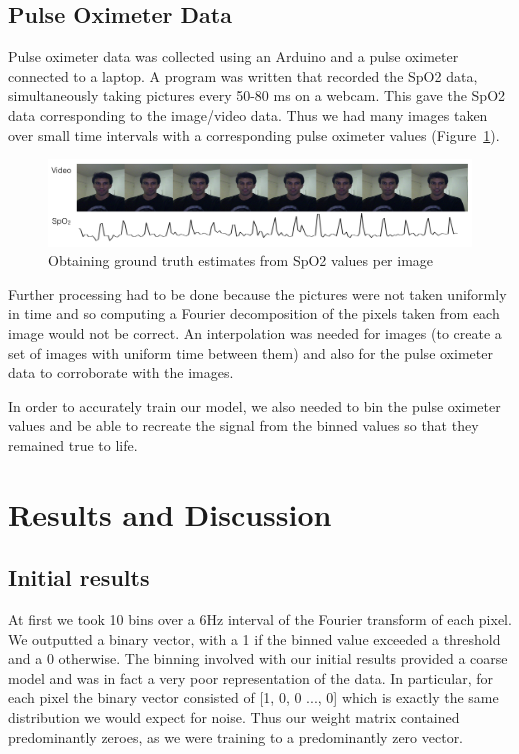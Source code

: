 \documentclass[12pt]{article}
\begin{document}
\subsection*{Pulse Oximeter Data}
  Pulse oximeter data was collected using an Arduino and a pulse oximeter connected to a laptop. 
  A program was written that recorded the SpO2 data, simultaneously taking pictures every 50-80 ms on a webcam.
  This gave the SpO2 data corresponding to the image/video data.
  Thus we had many images taken over small time intervals with a corresponding pulse oximeter values (Figure~\ref{figure:images_and_pulseox}).

  \begin{figure}
    \captionsetup{justification=centering}
    \includegraphics[width=\textwidth]{images/fig3.png}
    \caption{Obtaining ground truth estimates from SpO2 values per image \label{figure:images_and_pulseox}}
  \end{figure}

  Further processing had to be done because the pictures were not taken uniformly in time and so computing a Fourier decomposition of the pixels taken from each image would not be correct.
  An interpolation was needed for images (to create a set of images with uniform time between them) and also for the pulse oximeter data to corroborate with the images.

  In order to accurately train our model, we also needed to bin the pulse oximeter values and be able to recreate the signal from the binned values so that they remained true to life.
  
  


\section{Results and Discussion}
 \subsection*{Initial results}
  At first we took 10 bins over a 6Hz interval of the Fourier transform of each pixel. We outputted a binary vector, with a 1 if the binned value exceeded a threshold and a 0 otherwise. The binning involved with our initial results provided a coarse model and was in fact a very poor representation of the data. In particular, for each pixel the binary vector consisted of [1, 0, 0 ..., 0] which is exactly the same distribution we would expect for noise. Thus our weight matrix contained predominantly zeroes, as we were training to a predominantly zero vector.
\end{document}
